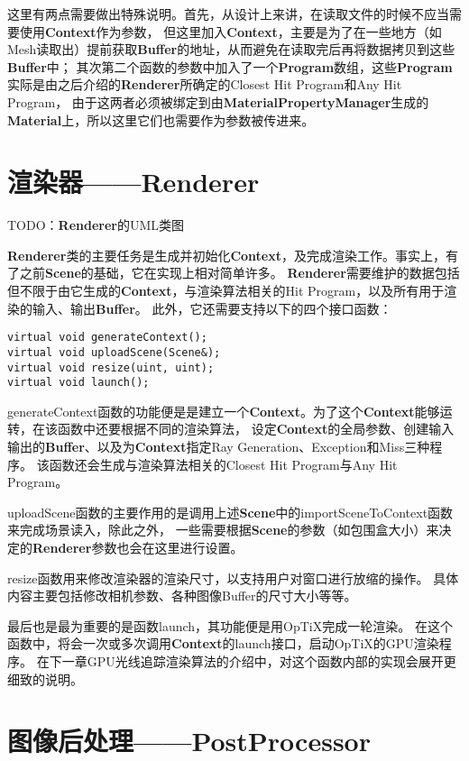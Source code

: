 这里有两点需要做出特殊说明。首先，从设计上来讲，在读取文件的时候不应当需要使用\textbf{Context}作为参数，
但这里加入\textbf{Context}，主要是为了在一些地方（如Mesh读取出）提前获取\textbf{Buffer}的地址，从而避免在读取完后再将数据拷贝到这些\textbf{Buffer}中；
其次第二个函数的参数中加入了一个\textbf{Program}数组，这些\textbf{Program}实际是由之后介绍的\textbf{Renderer}所确定的Closest Hit Program和Any Hit Program，
由于这两者必须被绑定到由\textbf{MaterialPropertyManager}生成的\textbf{Material}上，所以这里它们也需要作为参数被传进来。

\section{渲染器——Renderer}
TODO：\textbf{Renderer}的UML类图

\textbf{Renderer}类的主要任务是生成并初始化\textbf{Context}，及完成渲染工作。事实上，有了之前\textbf{Scene}的基础，它在实现上相对简单许多。
\textbf{Renderer}需要维护的数据包括但不限于由它生成的\textbf{Context}，与渲染算法相关的Hit Program，以及所有用于渲染的输入、输出\textbf{Buffer}。
此外，它还需要支持以下的四个接口函数：

\lstset{language=C++}
\begin{lstlisting}
virtual void generateContext();
virtual void uploadScene(Scene&);
virtual void resize(uint, uint);
virtual void launch();
\end{lstlisting}

generateContext函数的功能便是是建立一个\textbf{Context}。为了这个\textbf{Context}能够运转，在该函数中还要根据不同的渲染算法，
设定\textbf{Context}的全局参数、创建输入输出的\textbf{Buffer}、以及为\textbf{Context}指定Ray Generation、Exception和Miss三种程序。
该函数还会生成与渲染算法相关的Closest Hit Program与Any Hit Program。

uploadScene函数的主要作用的是调用上述\textbf{Scene}中的importSceneToContext函数来完成场景读入，除此之外，
一些需要根据\textbf{Scene}的参数（如包围盒大小）来决定的\textbf{Renderer}参数也会在这里进行设置。

resize函数用来修改渲染器的渲染尺寸，以支持用户对窗口进行放缩的操作。
具体内容主要包括修改相机参数、各种图像Buffer的尺寸大小等等。

最后也是最为重要的是函数launch，其功能便是用OpTiX完成一轮渲染。
在这个函数中，将会一次或多次调用\textbf{Context}的launch接口，启动OpTiX的GPU渲染程序。
在下一章GPU光线追踪渲染算法的介绍中，对这个函数内部的实现会展开更细致的说明。

\section{图像后处理——PostProcessor}

